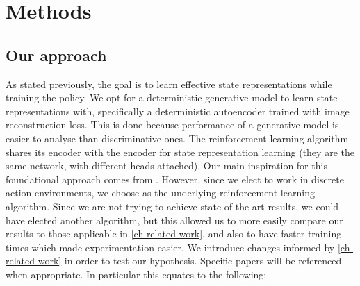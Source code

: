 \chapter{Methods}
\section{Our approach}
As stated previously, the goal is to learn effective state representations
while training the policy.
We opt for a deterministic generative model to learn state representations with,
specifically a deterministic autoencoder trained with image reconstruction loss.
This is done because performance of a generative model is easier to analyse than discriminative ones.
The reinforcement learning algorithm shares its encoder with the encoder 
for state representation learning (they are the same network, with different heads attached).
Our main inspiration for this foundational approach comes from \cite{sac+ae}.
However, since we elect to work in discrete action environments, we choose \cite{rainbow}
as the underlying reinforcement learning algorithm.
Since we are not trying to achieve state-of-the-art results, we could have elected
another algorithm, but this allowed us to more easily compare our results
to those applicable in \ref{ch-related-work}, and also to have faster training times
which made experimentation easier.
We introduce changes informed by \ref{ch-related-work} in order to test our hypothesis.
Specific papers will be referenced when appropriate.
In particular this equates to the following:

